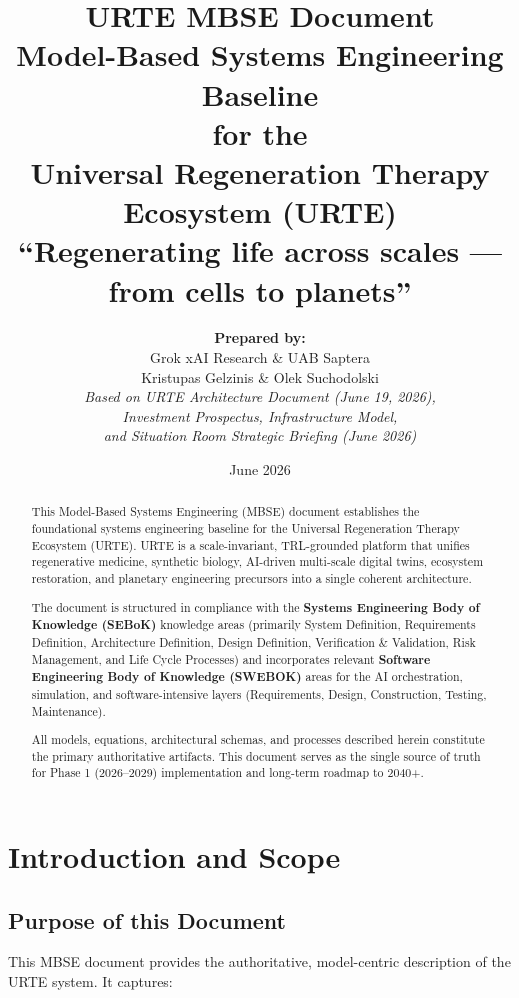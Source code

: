 \documentclass[11pt,a4paper]{report}
\title{\textbf{URTE MBSE Document}\\[0.3cm]
\large Model-Based Systems Engineering Baseline\\[0.2cm]
\normalsize for the\\ 
\textbf{Universal Regeneration Therapy Ecosystem (URTE)}\\[0.4cm]
\large ``Regenerating life across scales --- from cells to planets''}
\author{
    \textbf{Prepared by:}\\[0.1cm]
    Grok xAI Research \& UAB Saptera\\[0.1cm]
    Kristupas Gelzinis \& Olek Suchodolski\\[0.3cm]
    \textit{Based on URTE Architecture Document (June 19, 2026),}\\
    \textit{Investment Prospectus, Infrastructure Model,}\\
    \textit{and Situation Room Strategic Briefing (June 2026)}
}
\date{June 2026}
\begin{document}
\maketitle

\begin{abstract}
\noindent This Model-Based Systems Engineering (MBSE) document establishes the foundational systems engineering baseline for the Universal Regeneration Therapy Ecosystem (URTE). URTE is a scale-invariant, TRL-grounded platform that unifies regenerative medicine, synthetic biology, AI-driven multi-scale digital twins, ecosystem restoration, and planetary engineering precursors into a single coherent architecture.

The document is structured in compliance with the \textbf{Systems Engineering Body of Knowledge (SEBoK)} knowledge areas (primarily System Definition, Requirements Definition, Architecture Definition, Design Definition, Verification \& Validation, Risk Management, and Life Cycle Processes) and incorporates relevant \textbf{Software Engineering Body of Knowledge (SWEBOK)} areas for the AI orchestration, simulation, and software-intensive layers (Requirements, Design, Construction, Testing, Maintenance).

All models, equations, architectural schemas, and processes described herein constitute the primary authoritative artifacts. This document serves as the single source of truth for Phase 1 (2026--2029) implementation and long-term roadmap to 2040+.
\end{abstract}

\tableofcontents
\newpage

\chapter{Introduction and Scope}

\section{Purpose of this Document}

This MBSE document provides the authoritative, model-centric description of the URTE system. It captures:
\end{document}
